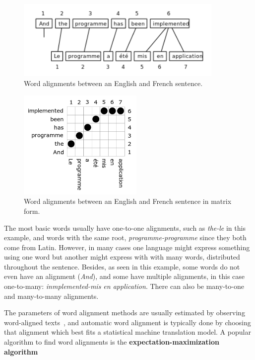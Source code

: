 \begin{figure}[!ht]
    \centering
    \includegraphics[width=10cm]{figures/word_align.png}
    \caption{Word alignments between an English and French sentence.}
\end{figure}

\begin{figure}[!ht]
    \centering
    \includegraphics[width=6cm]{figures/word_align_matrix.png}
    \caption{Word alignments between an English and French sentence in matrix form.}
\end{figure}

The most basic words usually have one-to-one alignments, such as \emph{the-le} in this example, and words with the same root, \emph{programme-programme} since they both come from Latin. However, in many cases one language might express something using one word but another might express with with many words, distributed throughout the sentence. Besides, as seen in this example, some words do not even have an alignment (\emph{And}), and some have multiple alignments, in this case one-to-many: \emph{inmplemented-mis en application}. There can also be many-to-one and many-to-many alignments.

The parameters of word alignment methods are usually estimated by observing word-aligned texts~\cite{brown1993mathematics}, and automatic word alignment is typically done by choosing that alignment which best fits a statistical machine translation model. A popular algorithm to find word alignments is the \textbf{expectation-maximization algorithm}~\cite{och1999improved}

